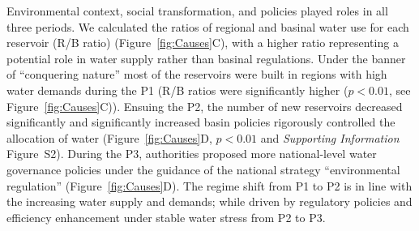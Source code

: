 Environmental context, social transformation, and policies played roles in all three periods.
We calculated the ratios of regional and basinal water use for each reservoir (R/B ratio) (Figure~\ref{fig:Causes}C), with a higher ratio representing a potential role in water supply rather than basinal regulations.
Under the banner of ``conquering nature'' most of the reservoirs were built in regions with high water demands during the P1 (R/B ratios were significantly higher ($p<0.01$, see Figure~\ref{fig:Causes}C)).
Ensuing the P2, the number of new reservoirs decreased significantly and significantly increased basin policies rigorously controlled the allocation of water (Figure~\ref{fig:Causes}D, $p<0.01$ and \textit{Supporting Information} Figure~S2).
During the P3, authorities proposed more national-level water governance policies under the guidance of the national strategy ``environmental regulation'' (Figure~\ref{fig:Causes}D).
The regime shift from P1 to P2 is in line with the increasing water supply and demands; while driven by regulatory policies and efficiency enhancement under stable water stress from P2 to P3.
